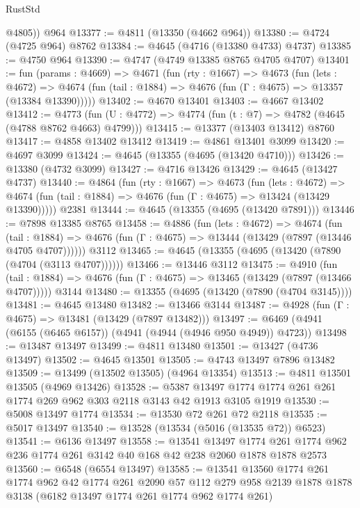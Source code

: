 \begin{lexlean}{RustStd}
\begin{coremodule}
        @4805))
    @964
@13377 := @4811 (@13350 (@4662 @964))
@13380 := @4724 (@4725 @964) @8762
@13384 := @4645 (@4716 (@13380 @4733) @4737)
@13385 := @4750 @964
@13390 := @4747 (@4749 @13385 @8765 @4705 @4707)
@13401 := fun (params : @4669) =>
  @4671
    (fun (rty : @1667) =>
    @4673
      (fun (lets : @4672) =>
      @4674 (fun (tail : @1884) => @4676 (fun (Γ : @4675) => @13357 (@13384 @13390)))))
@13402 := @4670 @13401
@13403 := @4667 @13402
@13412 := @4773 (fun (U : @4772) => @4774 (fun (t : @7) => @4782 (@4645 (@4788 @8762 @4663) @4799)))
@13415 := @13377 (@13403 @13412) @8760
@13417 := @4858 @13402 @13412
@13419 := @4861 @13401 @3099
@13420 := @4697 @3099
@13424 := @4645 (@13355 (@4695 (@13420 @4710)))
@13426 := @13380 (@4732 @3099)
@13427 := @4716 @13426
@13429 := @4645 (@13427 @4737)
@13440 := @4864
    (fun (rty : @1667) =>
    @4673
      (fun (lets : @4672) =>
      @4674 (fun (tail : @1884) => @4676 (fun (Γ : @4675) => @13424 (@13429 @13390)))))
    @2381
@13444 := @4645 (@13355 (@4695 (@13420 @7891)))
@13446 := @7898 @13385 @8765
@13458 := @4886
    (fun (lets : @4672) =>
    @4674
      (fun (tail : @1884) =>
      @4676 (fun (Γ : @4675) => @13444 (@13429 (@7897 (@13446 @4705 @4707))))))
    @3112
@13465 := @4645 (@13355 (@4695 (@13420 (@7890 (@4704 (@3113 @4707))))))
@13466 := @13446 @3112
@13475 := @4910
    (fun (tail : @1884) => @4676 (fun (Γ : @4675) => @13465 (@13429 (@7897 (@13466 @4707)))))
    @3144
@13480 := @13355 (@4695 (@13420 (@7890 (@4704 @3145))))
@13481 := @4645 @13480
@13482 := @13466 @3144
@13487 := @4928 (fun (Γ : @4675) => @13481 (@13429 (@7897 @13482)))
@13497 := @6469 (@4941 (@6155 (@6465 @6157)) (@4941 (@4944 (@4946 @950 @4949)) @4723))
@13498 := @13487 @13497
@13499 := @4811 @13480
@13501 := @13427 (@4736 @13497)
@13502 := @4645 @13501
@13505 := @4743 @13497 @7896 @13482
@13509 := @13499 (@13502 @13505) (@4964 @13354)
@13513 := @4811 @13501 @13505 (@4969 @13426)
@13528 := @5387 @13497 @1774 @1774 @261 @261 @1774 @269 @962 @303 @2118 @3143 @42 @1913 @3105 @1919
@13530 := @5008 @13497 @1774
@13534 := @13530 @72 @261 @72 @2118
@13535 := @5017 @13497
@13540 := @13528 (@13534 (@5016 (@13535 @72)) @6523)
@13541 := @6136 @13497
@13558 := @13541
    @13497
    @1774
    @261
    @1774
    @962
    @236
    @1774
    @261
    @3142
    @40
    @168
    @42
    @238
    @2060
    @1878
    @1878
    @2573
@13560 := @6548 (@6554 @13497)
@13585 := @13541
    @13560
    @1774
    @261
    @1774
    @962
    @42
    @1774
    @261
    @2090
    @57
    @112
    @279
    @958
    @2139
    @1878
    @1878
    @3138
    (@6182 @13497 @1774 @261 @1774 @962 @1774 @261)

\end{coremodule}
\end{lexlean}

